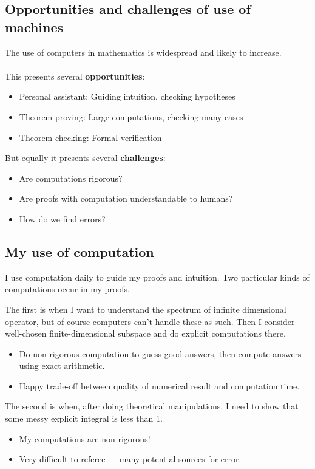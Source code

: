 \subsection{Opportunities and challenges of use of machines}
The use of computers in mathematics is widespread and likely to increase.\\
\hfill\\
This presents several \textbf{opportunities}:
\begin{itemize}
\item Personal assistant: Guiding intuition, checking hypotheses
\item Theorem proving: Large computations, checking many cases
\item Theorem checking: Formal verification
\end{itemize}
But equally it presents several \textbf{challenges}:
\begin{itemize}
\item Are computations rigorous?
\item Are proofs with computation understandable to humans?
\item How do we find errors?
\end{itemize}


\subsection{My use of computation}
I use computation daily to guide my proofs and intuition.
Two particular kinds of computations occur in my proofs.
\par
The first is when I want to understand the spectrum of infinite dimensional operator, but of course computers can't handle these as such. Then I consider well-chosen finite-dimensional subspace and do explicit computations there.
\begin{itemize}
\item Do non-rigorous computation to guess good answers, then compute answers using exact arithmetic.
\item Happy trade-off between quality of numerical result and computation time.
\end{itemize}%
The second is when, after doing theoretical manipulations, I need to show that some messy explicit integral is less than 1.
\begin{itemize}
\item My computations are non-rigorous!
\item Very difficult to referee --- many potential sources for error.
\end{itemize}
